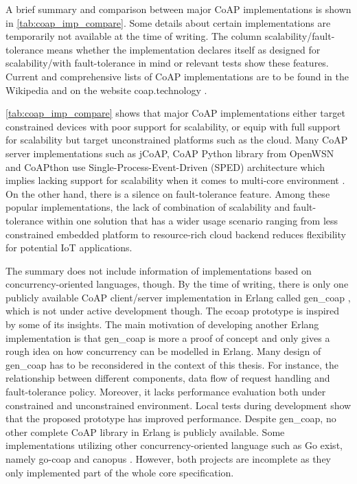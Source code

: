 A brief summary and comparison between major CoAP implementations is shown in \autoref{tab:coap_imp_compare}. Some details about certain implementations are temporarily not available at the time of writing. The column scalability/fault-tolerance means whether the implementation declares itself as designed for scalability/with fault-tolerance in mind or relevant tests show these features. Current and comprehensive lists of CoAP implementations are to be found in the Wikipedia \cite{coap_wiki} and on the website coap.technology \cite{coap_tech}.

\autoref{tab:coap_imp_compare} shows that major CoAP implementations either target constrained devices with poor support for scalability, or equip with full support for scalability but target unconstrained platforms such as the cloud. Many CoAP server implementations such as jCoAP, CoAP Python library from OpenWSN and CoAPthon use Single-Process-Event-Driven (SPED) architecture which implies lacking support for scalability when it comes to multi-core environment \cite{kovatsch2015scalable}. On the other hand, there is a silence on fault-tolerance feature. Among these popular implementations, the lack of combination of scalability and fault-tolerance within one solution that has a wider usage scenario ranging from less constrained embedded platform to resource-rich cloud backend reduces flexibility for potential IoT applications.

The summary does not include information of implementations based on concurrency-oriented languages, though. By the time of writing, there is only one publicly available CoAP client/server implementation in Erlang called gen\_coap \cite{gen_coap}, which is not under active development though. The ecoap prototype is inspired by some of its insights. The main motivation of developing another Erlang implementation is that gen\_coap is more a proof of concept and only gives a rough idea on how concurrency can be modelled in Erlang. Many design of gen\_coap has to be reconsidered in the context of this thesis. For instance, the relationship between different components, data flow of request handling and fault-tolerance policy. Moreover, it lacks performance evaluation both under constrained and unconstrained environment. Local tests during development show that the proposed prototype has improved performance. Despite gen\_coap, no other complete CoAP library in Erlang is publicly available. Some implementations utilizing other concurrency-oriented language such as Go \cite{go} exist, namely go-coap \cite{go-coap} and canopus \cite{canopus}. However, both projects are incomplete as they only implemented part of the whole core specification. 
 
